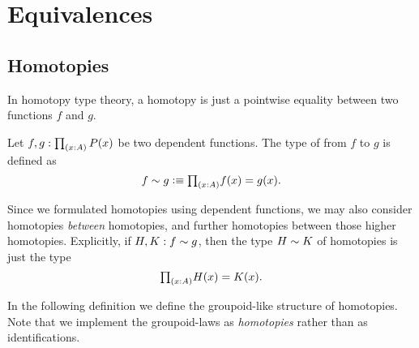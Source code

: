 
\section{Equivalences}

\subsection{Homotopies}
In homotopy type theory, a homotopy is just a pointwise equality between two functions $f$ and $g$.

\begin{defn}
Let $f,g:\prd{x:A}P(x)$ be two dependent functions. The type of  from $f$ to $g$ is defined as
\begin{equation*}
f\htpy g \defeq \prd{x:A} f(x)=g(x).
\end{equation*}
\end{defn}

Since we formulated homotopies using dependent functions, we may also consider homotopies \emph{between} homotopies, and further homotopies between those higher homotopies. 
Explicitly, if $H,K:f\sim g$, then the type $H\sim K$ of homotopies is just the type
\begin{equation*}
\prd{x:A} H(x)=K(x).
\end{equation*}

In the following definition we define the groupoid-like structure of homotopies. Note that we implement the groupoid-laws as \emph{homotopies} rather than as identifications.

